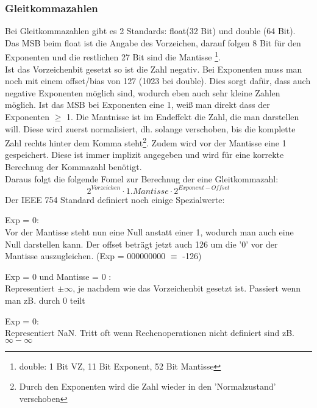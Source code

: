 \documentclass[a4paper]{scrartcl}
\begin{document}
        \subsubsection{Gleitkommazahlen}
            Bei Gleitkommazahlen gibt es 2 Standards: float(32 Bit) und double (64 Bit). 
            Das MSB beim float ist die Angabe des Vorzeichen, darauf folgen 8 Bit für den Exponenten und die restlichen 27 Bit sind die Mantisse \footnote{double: 1 Bit VZ, 11 Bit Exponent, 52 Bit Mantisse}. \\
            Ist das Vorzeichenbit gesetzt so ist die Zahl negativ. Bei Exponenten muss man noch mit einem offset/bias von 127 (1023 bei double). Dies sorgt dafür, dass auch negative Exponenten
            möglich sind, wodurch eben auch sehr kleine Zahlen möglich. Ist das MSB bei Exponenten eine 1, weiß man direkt dass der Exponenten \(\geq\) 1. Die Mantnisse ist im Endeffekt die Zahl, die man
            darstellen will. Diese wird zuerst normalisiert, dh. solange verschoben, bis die komplette Zahl rechts hinter dem Komma steht\footnote{Durch den Exponenten wird die Zahl wieder in den 'Normalzustand' verschoben}.
            Zudem wird vor der Mantisse eine 1 gespeichert. Diese ist immer implizit angegeben und wird für eine korrekte Berechnug der Kommazahl benötigt.\\
            Daraus folgt die folgende Fomel zur Berechnug der eine Gleitkommazahl: 
            \begin{equation}
                2^{Vorzeichen} \cdot 1.Mantisse \cdot 2^{Exponent - Offset} 
            \end{equation}
            Der IEEE 754 Standard definiert noch einige Spezialwerte: 
            \begin{description}
                \item Exp = 0: \hfill \\
                    Vor der Mantisse steht nun eine Null anstatt einer 1, wodurch man auch eine Null darstellen kann. Der offset beträgt jetzt auch 126 um die '0' vor der Mantisse
                    auszugleichen. (Exp = 000000000 \(\equiv \) -126)
                \item Exp = 0 und Mantisse = 0 : \hfill \\
                    Representiert \(\pm \infty\), je nachdem wie das Vorzeichenbit gesetzt ist. Passiert wenn man zB. durch 0 teilt 
                \item Exp = 0: \hfill \\
                    Representiert  NaN. Tritt oft wenn Rechenoperationen nicht definiert sind zB. \(\infty - \infty\)
            \end{description}
            
\end{document}
